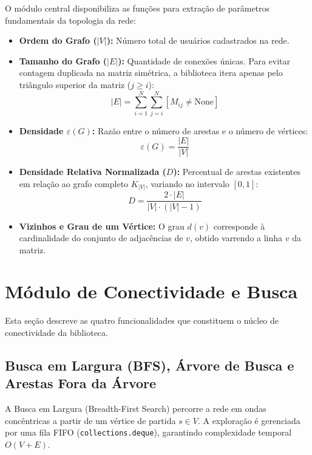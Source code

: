 \documentclass[12pt,a4paper]{article}
\begin{document}
O módulo central disponibiliza as funções para extração de parâmetros fundamentais da topologia da rede:
\begin{itemize}
    \item \textbf{Ordem do Grafo ($|V|$):} Número total de usuários cadastrados na rede.
    \item \textbf{Tamanho do Grafo ($|E|$):} Quantidade de conexões únicas. Para evitar contagem duplicada na matriz simétrica, a biblioteca itera apenas pelo triângulo superior da matriz ($j \ge i$):
    \begin{equation}
        |E| = \sum_{i=1}^{N} \sum_{j=i}^{N} [M_{ij} \ne \text{None}]
    \end{equation}
    \item \textbf{Densidade $\varepsilon(G)$:} Razão entre o número de arestas e o número de vértices:
    \begin{equation}
        \varepsilon(G) = \frac{|E|}{|V|}
    \end{equation}
    \item \textbf{Densidade Relativa Normalizada ($D$):} Percentual de arestas existentes em relação ao grafo completo $K_{|V|}$, variando no intervalo $[0, 1]$:
    \begin{equation}
        D = \frac{2 \cdot |E|}{|V| \cdot (|V| - 1)}
    \end{equation}
    \item \textbf{Vizinhos e Grau de um Vértice:} O grau $d(v)$ corresponde à cardinalidade do conjunto de adjacências de $v$, obtido varrendo a linha $v$ da matriz.
\end{itemize}

\section{Módulo de Conectividade e Busca}

Esta seção descreve as quatro funcionalidades que constituem o núcleo de conectividade da biblioteca.

\subsection{Busca em Largura (BFS), Árvore de Busca e Arestas Fora da Árvore}
A Busca em Largura (Breadth-First Search) percorre a rede em ondas concêntricas a partir de um vértice de partida $s \in V$. A exploração é gerenciada por uma fila FIFO (\texttt{collections.deque}), garantindo complexidade temporal $O(V + E)$.
\end{document}
